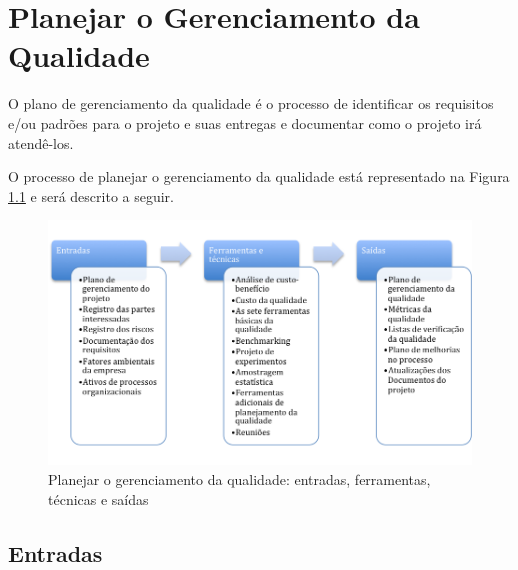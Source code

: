 \chapter{Planejar o Gerenciamento da Qualidade}

O plano de gerenciamento da qualidade é o processo de identificar os requisitos e/ou padrões para o projeto e suas entregas e documentar como o projeto irá atendê-los.

O processo de planejar o gerenciamento da qualidade está representado na Figura \ref{fig:qualidade:plan:efts} e será descrito a seguir.

\begin{figure}[!h]
	\centering
	\includegraphics[scale=0.5]{Figuras/qualidade_efts_planejar.png}
	\caption{Planejar o gerenciamento da qualidade: entradas, ferramentas, técnicas e saídas}
	\label{fig:qualidade:plan:efts}
\end{figure}

\section{Entradas}

